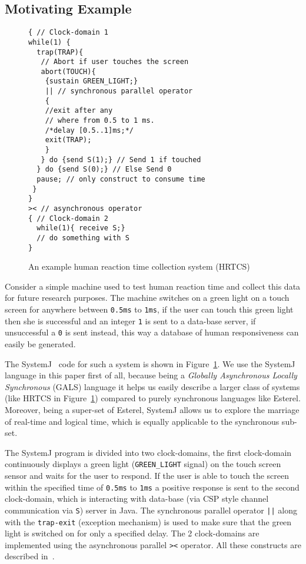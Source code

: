 \subsection{Motivating Example}
\label{sec:motivating-example}

\begin{figure}[t!]
\begin{minipage}{5cm}
\begin{verbatim}
{ // Clock-domain 1
while(1) {
  trap(TRAP){
   // Abort if user touches the screen
   abort(TOUCH){
    {sustain GREEN_LIGHT;}
    || // synchronous parallel operator
    {
    //exit after any 
    // where from 0.5 to 1 ms.
    /*delay [0.5..1]ms;*/
    exit(TRAP); 
    }
   } do {send S(1);} // Send 1 if touched 
  } do {send S(0);} // Else Send 0
  pause; // only construct to consume time
 }
}
>< // asynchronous operator
{ // Clock-domain 2
  while(1){ receive S;}
  // do something with S
}
\end{verbatim}
\end{minipage}
\caption{An example human reaction time collection system (HRTCS)}
\label{fig:1}
\end{figure}

Consider a simple machine used to test human reaction time and collect
this data for future research purposes. The machine switches on a green
light on a touch screen for anywhere between \texttt{0.5ms} to
\texttt{1ms}, if the user can touch this green light then she is
successful and an integer \texttt{1} is sent to a data-base server, if
unsuccessful a \texttt{0} is sent instead, this way a database of human
responsiveness can easily be generated.

The SystemJ~\cite{amal10} code for such a system is shown in
Figure~\ref{fig:1}. We use the SystemJ language in this paper first of
all, because being a \textit{Globally Asynchronous Locally Synchronous}
(GALS) language it helps us easily describe a larger class of systems
(like HRTCS in Figure~\ref{fig:1}) compared to purely synchronous
languages like Esterel. Moreover, being a super-set of Esterel, SystemJ
allows us to explore the marriage of real-time and logical time, which
is equally applicable to the synchronous sub-set.

The SystemJ program is divided into two clock-domains, the first
clock-domain continuously displays a green light (\texttt{GREEN\_LIGHT}
signal) on the touch screen sensor and waits for the user to respond. If
the user is able to touch the screen within the specified time of
\texttt{0.5ms} to \texttt{1ms} a positive response is sent to the second
clock-domain, which is interacting with data-base (via CSP style channel
communication via \texttt{S}) server in Java. The synchronous parallel
operator \texttt{||} along with the \texttt{trap-exit} (exception
mechanism) is used to make sure that the green light is switched on for
only a specified delay. The 2 clock-domains are implemented using the
asynchronous parallel \texttt{><} operator. All these constructs are
described in~\cite{amal10}.

